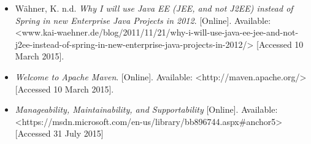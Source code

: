 \documentclass[a4paper,12pt]{article}
\begin{document}
\begin{itemize}
			\item Wähner, K. n.d. \textit{Why I will use Java EE (JEE, and not J2EE) instead of Spring in new Enterprise Java Projects in 2012}. [Online]. Available: <www.kai-waehner.de/blog/2011/11/21/why-i-will-use-java-ee-jee-and-not-j2ee-instead-of-spring-in-new-enterprise-java-projects-in-2012/> [Accessed 10 March 2015].		

			\item \textit{Welcome to Apache Maven}. [Online]. Available: <http://maven.apache.org/> [Accessed 10 March 2015].
			
			\item \textit{Manageability, Maintainability, and Supportability} [Online]. Available: <https://msdn.microsoft.com/en-us/library/bb896744.aspx#anchor5> [Accessed 31 July 2015]
			
			

			

		\end{itemize}
\end{document}
